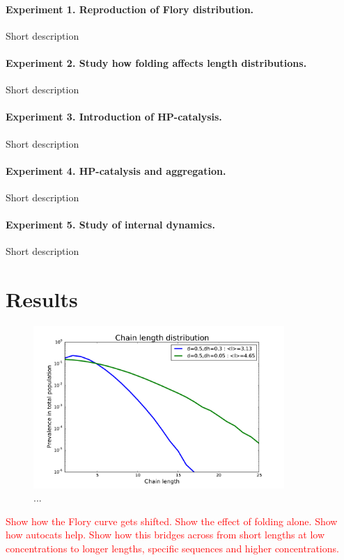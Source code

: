 \documentclass[12pt]{paper}
\newcommand{\red}[1]{\textcolor{red}{#1}}
\begin{document}
\paragraph{Experiment 1. Reproduction of Flory distribution.}
Short description

\paragraph{Experiment 2. Study how folding affects length distributions.}
Short description

\paragraph{Experiment 3. Introduction of HP-catalysis.}
Short description

\paragraph{Experiment 4. HP-catalysis and aggregation.}
Short description


\paragraph{Experiment 5. Study of internal dynamics.}
Short description




\section{Results}
\begin{figure}[h!]
  \centering
  \includegraphics[width=0.85\textwidth]{pictures/flory-last.pdf} 
  \caption{...}
  \label{fig:sim.flory}
\end{figure}

\red{ Show how the Flory curve gets shifted.  Show the 
effect of folding alone.  Show how autocats help.  Show how this bridges across from short lengths 
at low concentrations to longer lengths, specific sequences and higher concentrations.}
\end{document}
